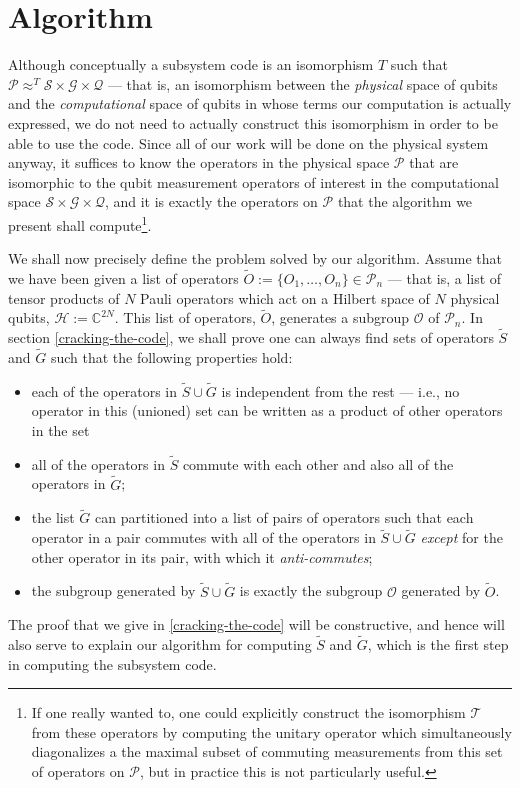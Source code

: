 \documentclass[twocolumn,showpacs,preprintnumbers,amsmath,amssymb,nofootinbib,pra,floatfix]{revtex4}
\begin{document}
\section{Algorithm}

Although conceptually a subsystem code is an isomorphism $T$ such that  $\mathscr{P}\approx^T \mathscr{S}\times\mathscr{G}\times\mathscr{Q}$ --- that is, an isomorphism between the \emph{physical} space of qubits and the \emph{computational} space of qubits in whose terms our computation is actually expressed, we do not need to actually construct this isomorphism in order to be able to use the code.  Since all of our work will be done on the physical system anyway, it suffices to know the operators in the physical space $\mathscr{P}$ that are isomorphic to the qubit measurement operators of interest in the computational space $\mathscr{S}\times\mathscr{G}\times\mathscr{Q}$, and it is exactly the operators on $\mathscr{P}$ that the algorithm we present shall compute\footnote{If one really wanted to, one could explicitly construct the isomorphism $\mathscr{T}$ from these operators by computing the unitary operator which simultaneously diagonalizes a the maximal subset of commuting measurements from this set of operators on $\mathscr{P}$, but in practice this is not particularly useful.}.

We shall now precisely define the problem solved by our algorithm.  Assume that we have been given a list of operators $\tilde O :=\{O_1,\dots,O_n\}\in \mathcal{P}_n$ --- that is, a list of tensor products of $N$ Pauli operators which act on a Hilbert space of $N$ physical qubits, $\mathscr{H}:=\mathbb{C}^{2N}$.  This list of operators, $\tilde O$, generates a subgroup $\mathcal{O}$ of $\mathcal{P}_n$.  In section \ref{cracking-the-code}, we shall prove one can always find sets of operators $\tilde S$ and $\tilde G$ such that the following properties hold:
\begin{itemize}
\item each of the operators in $\tilde S \cup \tilde G$ is
  independent from the rest --- i.e., no operator in this (unioned) set can
  be written as a product of other operators in the set
\item all of the operators in $\tilde S$ commute with each other and
  also all of the operators in $\tilde G$;
\item the list $\tilde G$ can partitioned into a list of pairs of
  operators such that each operator in a pair commutes with all of the
  operators in $\tilde S \cup \tilde G$ \emph{except} for the other
  operator in its pair, with which it \emph{anti-commutes};
\item the subgroup generated by $\tilde S \cup \tilde G$ is exactly
  the subgroup $\mathcal{O}$ generated by $\tilde O$.
\end{itemize}
The proof that we give in \ref{cracking-the-code} will be
constructive, and hence will also serve to explain our algorithm for
computing $\tilde S$ and $\tilde G$, which is the first step in
computing the subsystem code.
\end{document}
